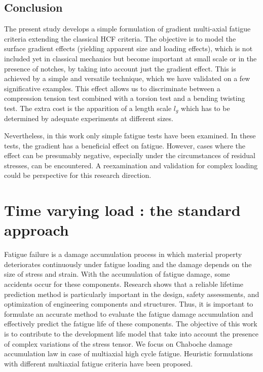 \documentclass[3p,times,procedia,number]{elsarticle}
\begin{document}
\subsection{Conclusion}

The present study develops a simple formulation of gradient
multi-axial fatigue criteria extending the classical HCF criteria.
The objective is to model the surface gradient effects (yielding
apparent size and loading effects), which is not included yet in classical mechanics but become important at small scale or in the presence of notches, by taking into account just the gradient effect.  This is achieved by a simple and versatile technique, which we have validated on a few significative examples.  This effect allows us to discriminate between a compression tension test combined with a torsion test and a bending twisting test.  The extra cost is the apparition of a length scale $l_g$ which has to be determined by adequate experiments at different sizes. 

Nevertheless, in this work only simple fatigue tests have been examined. In these tests, the gradient has a beneficial effect on fatigue. However, cases where the effect can be presumably negative, especially under the circumstances of residual stresses, can be encountered. A reexamination and validation for complex loading could be perspective for this research direction. 

\section{Time varying load : the standard approach}
Fatigue failure is a damage accumulation process in which material property deteriorates continuously under
fatigue loading and the damage depends on the size of
stress and strain. With the accumulation of fatigue
damage, some accidents occur for these components. Research shows that a reliable lifetime prediction method is
particularly important in the design, safety assessments,
and optimization of engineering components and structures. Thus, it is important to formulate an accurate method
to evaluate the fatigue damage accumulation and effectively predict the fatigue life of these components.
The objective of this work is to contribute to the development life model that take into account the presence of complex variations of the stress tensor. We focus on Chaboche damage accumulation law in case of multiaxial high cycle fatigue. Heuristic formulations with different multiaxial fatigue criteria have been proposed. 
\end{document}
